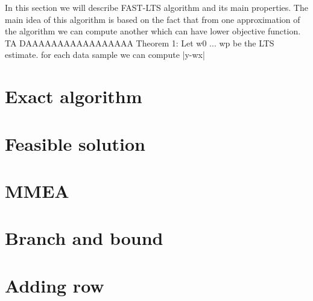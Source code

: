 In this section we will describe FAST-LTS algorithm and its main properties. The main idea of this algorithm is based on the fact that from one approximation of the algorithm we can compute another which can have lower objective function.
 TA DAAAAAAAAAAAAAAAAA
Theorem 1: \cite{rybicka}
Let w0 ... wp be the LTS estimate.
for each data sample we can compute |y-wx|




\section{Exact algorithm}
\section{Feasible solution}
\section{MMEA}
\section{Branch and bound}
\section{Adding row}
